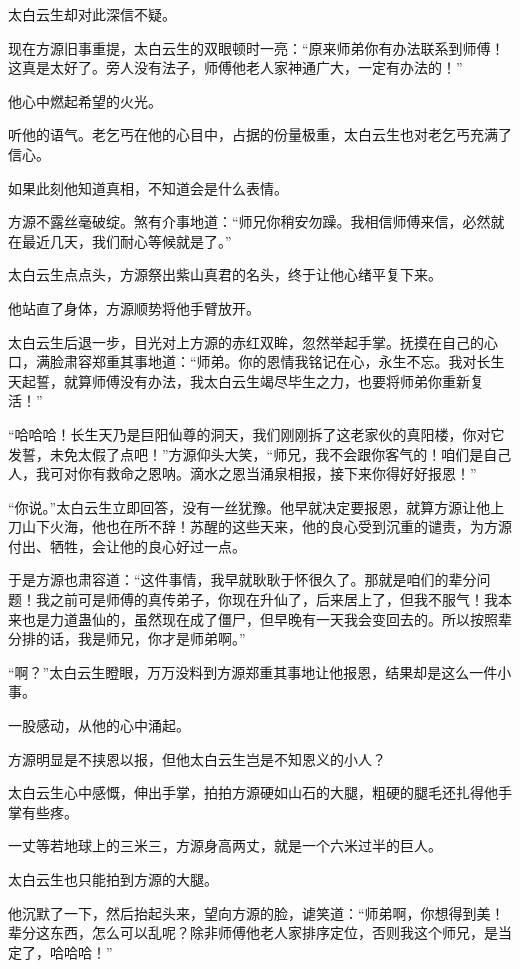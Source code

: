 \begin{this_body}
太白云生却对此深信不疑。

现在方源旧事重提，太白云生的双眼顿时一亮：“原来师弟你有办法联系到师傅！这真是太好了。旁人没有法子，师傅他老人家神通广大，一定有办法的！”

他心中燃起希望的火光。

听他的语气。老乞丐在他的心目中，占据的份量极重，太白云生也对老乞丐充满了信心。

如果此刻他知道真相，不知道会是什么表情。

方源不露丝毫破绽。煞有介事地道：“师兄你稍安勿躁。我相信师傅来信，必然就在最近几天，我们耐心等候就是了。”

太白云生点点头，方源祭出紫山真君的名头，终于让他心绪平复下来。

他站直了身体，方源顺势将他手臂放开。

太白云生后退一步，目光对上方源的赤红双眸，忽然举起手掌。抚摸在自己的心口，满脸肃容郑重其事地道：“师弟。你的恩情我铭记在心，永生不忘。我对长生天起誓，就算师傅没有办法，我太白云生竭尽毕生之力，也要将师弟你重新复活！”

“哈哈哈！长生天乃是巨阳仙尊的洞天，我们刚刚拆了这老家伙的真阳楼，你对它发誓，未免太假了点吧！”方源仰头大笑，“师兄，我不会跟你客气的！咱们是自己人，我可对你有救命之恩呐。滴水之恩当涌泉相报，接下来你得好好报恩！”

“你说。”太白云生立即回答，没有一丝犹豫。他早就决定要报恩，就算方源让他上刀山下火海，他也在所不辞！苏醒的这些天来，他的良心受到沉重的谴责，为方源付出、牺牲，会让他的良心好过一点。

于是方源也肃容道：“这件事情，我早就耿耿于怀很久了。那就是咱们的辈分问题！我之前可是师傅的真传弟子，你现在升仙了，后来居上了，但我不服气！我本来也是力道蛊仙的，虽然现在成了僵尸，但早晚有一天我会变回去的。所以按照辈分排的话，我是师兄，你才是师弟啊。”

“啊？”太白云生瞪眼，万万没料到方源郑重其事地让他报恩，结果却是这么一件小事。

一股感动，从他的心中涌起。

方源明显是不挟恩以报，但他太白云生岂是不知恩义的小人？

太白云生心中感慨，伸出手掌，拍拍方源硬如山石的大腿，粗硬的腿毛还扎得他手掌有些疼。

一丈等若地球上的三米三，方源身高两丈，就是一个六米过半的巨人。

太白云生也只能拍到方源的大腿。

他沉默了一下，然后抬起头来，望向方源的脸，谑笑道：“师弟啊，你想得到美！辈分这东西，怎么可以乱呢？除非师傅他老人家排序定位，否则我这个师兄，是当定了，哈哈哈！”


\end{this_body}

